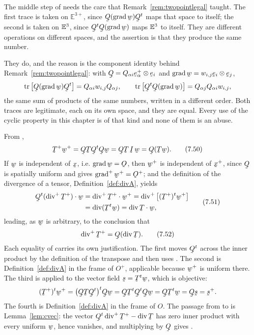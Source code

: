 \begin{remark}\label{rem:ch7twotraces}
The middle step of  needs the care that
Remark~\ref{rem:twopointlegal} taught. The first trace is taken on
$\mathbb{E}^{3+}$, since $\bQ(\grad\bw)\bQ^{t}$ maps that space to
itself; the second is taken on $\mathbb{E}^{3}$, since $\bQ^{t}\bQ(\grad\bw)$ maps
$\mathbb{E}^{3}$ to itself. They are different operations on different spaces, and
the assertion is that they produce the same number.

They do, and the reason is the component identity behind
Remark~\ref{rem:twopointlegal}: with
$\bQ=Q_{\alpha i}\be^{+}_{\alpha}\otimes\be_{i}$ and
$\grad\bw=w_{i,j}\be_{i}\otimes\be_{j}$,
\[
   \tr\big[\bQ(\grad\bw)\bQ^{t}\big]=Q_{\alpha i}w_{i,j}Q_{\alpha j},
   \qquad
   \tr\big[\bQ^{t}\bQ(\grad\bw)\big]=Q_{\alpha j}Q_{\alpha i}w_{i,j},
\]
the same sum of products of the same numbers, written in a different
order. Both traces are legitimate, each on its own space, and they are
equal. Every use of the cyclic property in this chapter is of that kind
and none of them is an abuse.
\end{remark}

From ,
\begin{equation}
   \bT^{+}\bw^{+}=\bQ\bT\bQ^{t}\bQ\bw=\bQ\bT\,\I\,\bw=\bQ(\bT\bw).
   \tag{7.50}\label{eq:7.50}
\end{equation}
If $\bw$ is independent of $\bx$, i.e. $\grad\bw=\Ob$, then $\bw^{+}$ is
independent of $\bx^{+}$, since $\bQ$ is spatially uniform and
 gives $\grad^{+}\bw^{+}=\Ob^{+}$; and the definition
 of the divergence of a tensor, Definition~\ref{def:divA},
yields
\begin{equation}
\begin{aligned}
   \bQ^{t}(\dvg^{+}\bT^{+})\cdot\bw
   &=\dvg^{+}\bT^{+}\cdot\bw^{+}
    =\dvg^{+}\big[(\bT^{+})^{t}\bw^{+}\big]\\
   &=\dvg(\bT^{t}\bw)
    =\dvg\bT\cdot\bw ,
\end{aligned}
   \tag{7.51}\label{eq:7.51}
\end{equation}
leading, as $\bw$ is arbitrary, to the conclusion that
\begin{equation}
   \dvg^{+}\bT^{+}=\bQ(\dvg\bT).
   \tag{7.52}\label{eq:7.52}
\end{equation}
Each equality of  carries its own justification. The first
moves $\bQ^{t}$ across the inner product by the definition of the
transpose and then uses . The second is
Definition~\ref{def:divA} in the frame of $O^{+}$, applicable because
$\bw^{+}$ is uniform there. The third is  applied to the
vector field $\bs=\bT^{t}\bw$, which is objective:
\[
   (\bT^{+})^{t}\bw^{+}=\big(\bQ\bT\bQ^{t}\big)^{t}\bQ\bw
   =\bQ\bT^{t}\bQ^{t}\bQ\bw=\bQ\bT^{t}\bw=\bQ\bs=\bs^{+} .
\]
The fourth is Definition~\ref{def:divA} in the frame of $O$. The passage
from  to  is Lemma~\ref{lem:cvec}: the vector
$\bQ^{t}\dvg^{+}\bT^{+}-\dvg\bT$ has zero inner product with every
uniform $\bw$, hence vanishes, and multiplying by $\bQ$ gives .

